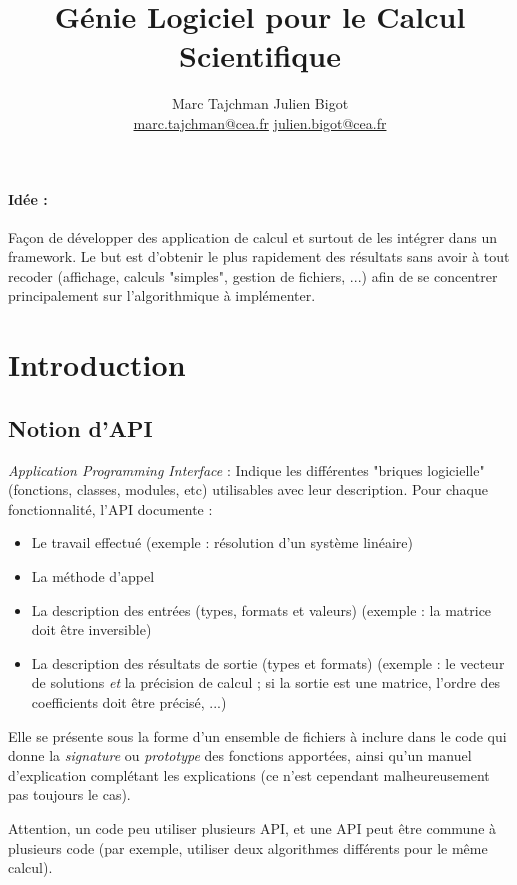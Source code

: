 \documentclass{article}
\title{Génie Logiciel pour le Calcul Scientifique}
\author{Marc Tajchman \hspace{5em} Julien Bigot\\
\url{marc.tajchman@cea.fr} \hspace{1.5em} \url{julien.bigot@cea.fr}}
\date{}
\begin{document}
\maketitle
\tableofcontents
\newpage

\paragraph{Idée :} Façon de développer des application de calcul et surtout de les intégrer dans un framework. Le but est d'obtenir le plus rapidement des résultats sans avoir à tout recoder (affichage, calculs "simples", gestion de fichiers, ...) afin de se concentrer principalement sur l'algorithmique à implémenter.

\section{Introduction}

\subsection{Notion d'API}
\emph{Application Programming Interface} : Indique les différentes "briques logicielle" (fonctions, classes, modules, etc) utilisables avec leur description. Pour chaque fonctionnalité, l'API documente :
\begin{itemize}
\item Le travail effectué (exemple : résolution d'un système linéaire)
\item La méthode d'appel
\item La description des entrées (types, formats et valeurs) (exemple : la matrice doit être inversible)
\item La description des résultats de sortie (types et formats) (exemple : le vecteur de solutions \emph{et} la précision de calcul ; si la sortie est une matrice, l'ordre des coefficients doit être précisé, ...)
\end{itemize}
\bigskip

Elle se présente sous la forme d'un ensemble de fichiers à inclure dans le code qui donne la \emph{signature} ou \emph{prototype} des fonctions apportées, ainsi qu'un manuel d'explication complétant les explications (ce n'est cependant malheureusement pas toujours le cas).

Attention, un code peu utiliser plusieurs API, et une API peut être commune à plusieurs code (par exemple, utiliser deux algorithmes différents pour le même calcul).
\end{document}
